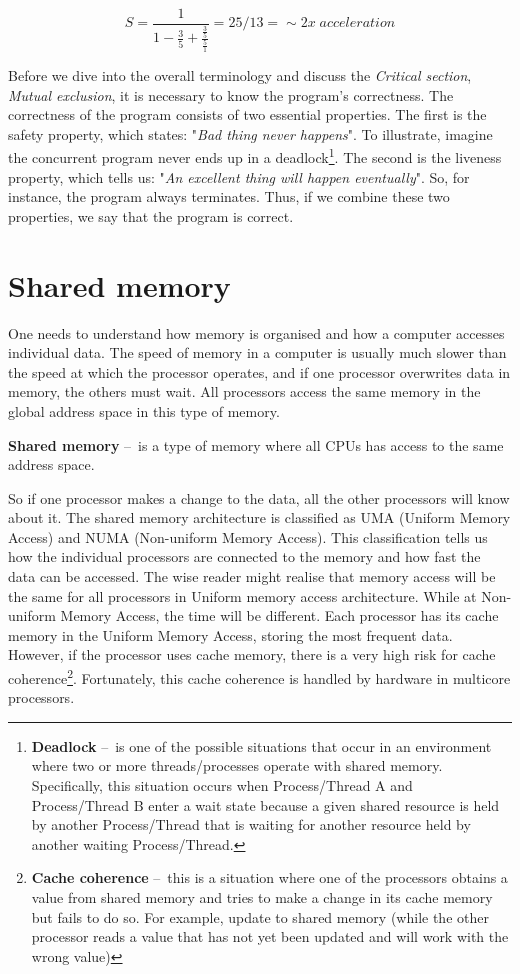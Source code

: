 \begin{equation}
    \label{eqn:amdalhinpractice}
    S = \frac{1}{1 - \frac{3}{5} + \frac{\frac{3}{5}}{\frac{5}{1}}} = 25/13 =\sim 2x \; acceleration
    \tag{2}
\end{equation}

Before we dive into the overall terminology and discuss the \emph{Critical section}, \emph{Mutual exclusion}, it is necessary to know the program's correctness.
The correctness of the program consists of two essential properties.
The first is the safety property, which states: "\emph{Bad thing never happens}". To illustrate, imagine the concurrent program never ends up in a deadlock\footnote{\textbf{Deadlock} \---\ is one of the possible situations that occur in an environment where two or more threads/processes operate with shared memory. Specifically, this situation occurs when Process/Thread A and Process/Thread B enter a wait state because a given shared resource is held by another Process/Thread that is waiting for another resource held by another waiting Process/Thread.}.
The second is the liveness property, which tells us: "\emph{An excellent thing will happen eventually}". So, for instance, the program always terminates.
Thus, if we combine these two properties, we say that the program is correct.

\section{Shared memory}
\label{04:sharedmemory}

One needs to understand how memory is organised and how a computer accesses individual data.
The speed of memory in a computer is usually much slower than the speed at which the processor operates, and if one processor overwrites data in memory, the others must wait.
All processors access the same memory in the global address space in this type of memory.
\begin{definition}
    \textbf{Shared memory} \---\ is a type of memory where all CPUs has access to the same address space.
\end{definition}
So if one processor makes a change to the data, all the other processors will know about it.
The shared memory architecture is classified as UMA (Uniform Memory Access) and NUMA (Non-uniform Memory Access).
This classification tells us how the individual processors are connected to the memory and how fast the data can be accessed.
The wise reader might realise that memory access will be the same for all processors in Uniform memory access architecture.
While at Non-uniform Memory Access, the time will be different.
Each processor has its cache memory in the Uniform Memory Access, storing the most frequent data.
However, if the processor uses cache memory, there is a very high risk for cache coherence\footnote {\textbf{Cache coherence} \---\ this is a situation where one of the processors obtains a value from shared memory and tries to make a change in its cache memory but fails to do so. For example, update to shared memory (while the other processor reads a value that has not yet been updated and will work with the wrong value)}. Fortunately, this cache coherence is handled by hardware in multicore processors.


